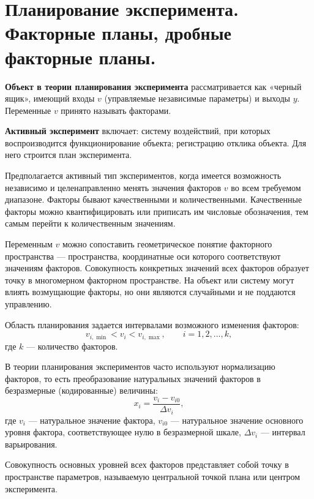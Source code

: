 \section{Планирование эксперимента. Факторные планы, дробные факторные планы.}

\textbf{Объект в теории планирования эксперимента} рассматривается как «черный ящик», имеющий входы $v$ (управляемые независимые параметры) и выходы $y$. Переменные $v$ принято называть факторами.

\textbf{Активный эксперимент} включает: систему воздействий, при которых воспроизводится функционирование объекта; регистрацию отклика объекта. Для него строится план эксперимента.

Предполагается активный тип экспериментов, когда имеется возможность независимо и целенаправленно менять значения факторов $v$ во всем требуемом диапазоне. Факторы бывают качественными и количественными. Качественные факторы можно квантифицировать или приписать им числовые обозначения, тем самым перейти к количественным значениям.

Переменным $v$ можно сопоставить геометрическое понятие факторного пространства — пространства, координатные оси которого соответствуют значениям факторов. Совокупность конкретных значений всех факторов образует точку в многомерном факторном пространстве. На объект или систему могут влиять возмущающие факторы, но они являются случайными и не поддаются управлению.

Область планирования задается интервалами возможного изменения факторов:
\[
  v_{i,\min} < v_i < v_{i,\max}, \qquad i=1,2,\ldots,k,
\]
где $k$ — количество факторов.

В теории планирования экспериментов часто используют нормализацию факторов, то есть преобразование натуральных значений факторов в безразмерные (кодированные) величины:
\[
  x_i = \frac{v_i-v_{i0}}{\Delta v_i},
\]
где $v_i$ — натуральное значение фактора, $v_{i0}$ — натуральное значение основного уровня фактора, соответствующее нулю в безразмерной шкале, $\Delta v_i$ — интервал варьирования.

Совокупность основных уровней всех факторов представляет собой точку в пространстве параметров, называемую центральной точкой плана или центром эксперимента.


